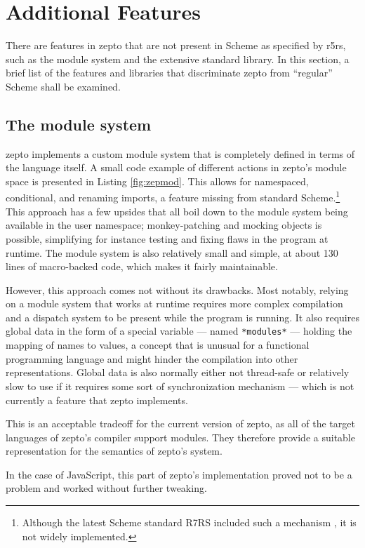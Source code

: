\documentclass[oneside,11pt,xetex]{scrbook}
\begin{document}
\section{Additional Features}

There are features in zepto that are not present in Scheme as specified by \gls{r5rs}, such
as the module system and the extensive standard library. In this section, a brief list of
the features and libraries that discriminate zepto from ``regular'' Scheme shall be examined.

\subsection{The module system}

zepto implements a custom module system that is completely defined in terms of the language
itself. A small code example of different actions in zepto's module space is presented in
Listing \ref{fig:zepmod}.
This allows for namespaced, conditional, and renaming imports, a feature missing from standard
Scheme.\footnote{Although the latest Scheme standard R7RS included such a mechanism \parencite{R7RS},
it is not widely implemented.}
This approach has a few upsides that all boil down to the module system being available in the
user namespace; monkey-patching and mocking objects is possible, simplifying for instance
testing and fixing flaws in the program at runtime. The module system is also relatively small
and simple, at about 130 lines of macro-backed code, which makes it fairly maintainable.

However, this approach comes not without its drawbacks. Most notably, relying on a module
system that works at runtime requires more complex compilation and a dispatch system to
be present while the program is running. It also requires global data in the form of a
special variable --- named \texttt{*modules*} --- holding the mapping of names to values,
a concept that is unusual for a functional programming language and might hinder the
compilation into other representations. Global data is also normally either not thread-safe
or relatively slow to use if it requires some sort of synchronization mechanism --- which is
not currently a feature that zepto implements.

This is an acceptable tradeoff for the current version of zepto, as all of the
target languages of zepto's compiler support modules. They therefore provide a
suitable representation for the semantics of zepto's system.

In the case of JavaScript, this part of zepto's implementation proved not
to be a problem and worked without further tweaking.
\end{document}
